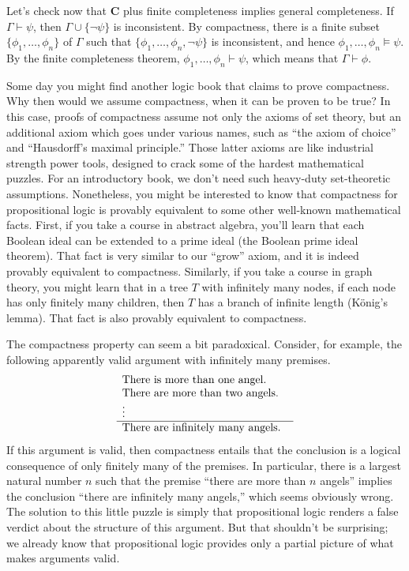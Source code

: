 Let's check now that \textbf{C} plus finite completeness implies
general completeness.  If $\Gamma\vdash\psi$, then
$\Gamma\cup\{\neg\psi \}$ is inconsistent.  By compactness, there is a
finite subset $\{ \phi _1,\dots ,\phi _n\}$ of $\Gamma$ such that
$\{ \phi _1,\dots ,\phi _n, \neg \psi\}$ is inconsistent, and hence
$\phi _1,\dots ,\phi _n\vDash\psi$.  By the finite completeness
theorem, $\phi _1,\dots ,\phi _n\vdash\psi$, which means that
$\Gamma\vdash\phi$.

Some day you might find another logic book that claims to prove
compactness.  Why then would we assume compactness, when it can be
proven to be true?  In this case, proofs of compactness assume not
only the axioms of set theory, but an additional axiom which goes
under various names, such as ``the axiom of choice'' and ``Hausdorff's
maximal principle.''  Those latter axioms are like industrial strength
power tools, designed to crack some of the hardest mathematical
puzzles.  For an introductory book, we don't need such heavy-duty
set-theoretic assumptions.  Nonetheless, you might be interested to
know that compactness for propositional logic is provably equivalent
to some other well-known mathematical facts.  First, if you take a
course in abstract algebra, you'll learn that each Boolean ideal can
be extended to a prime ideal (the Boolean prime ideal theorem).  That
fact is very similar to our ``grow'' axiom, and it is indeed provably
equivalent to compactness.  Similarly, if you take a course in graph
theory, you might learn that in a tree $T$ with infinitely many nodes,
if each node has only finitely many children, then $T$ has a branch of
infinite length (K\"onig's lemma).  That fact is also provably
equivalent to compactness.

The compactness property can seem a bit paradoxical.  Consider, for
example, the following apparently valid argument with infinitely many
premises.
\[ \begin{array}{p{5.3cm}}
     There is more than one angel.     \\
     There are more than two angels.     \\
     \vdots \\ \hline There are infinitely many angels. \end{array} \]
 If this argument is valid, then compactness entails that the conclusion is a logical
 consequence of only finitely many of the premises.  In particular,
 there is a largest natural number $n$ such that the premise ``there
 are more than $n$ angels'' implies the conclusion ``there are
 infinitely many angels,'' which seems obviously wrong.  The solution
 to this little puzzle is simply that propositional logic renders a
 false verdict about the structure of this argument.  But that
 shouldn't be surprising; we already know that propositional logic
 provides only a partial picture of what makes arguments valid.

